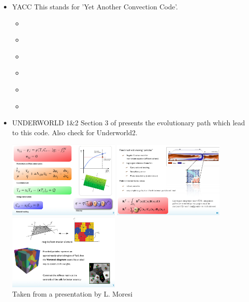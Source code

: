 \begin{itemize}
\item {\codefont YACC} 
This stands for 'Yet Another Convection Code'.

\begin{scriptsize}
\begin{itemize}
\item[\twothousandten]       \textcite{toyc10}
\item[\twothousandeleven]    \textcite{yutc11}
\item[\twothousandtwelve]    \textcite{sato12}
\item[\twothousandthirteen]  \textcite{toyd13}
\item[\twothousandfifteen]   \textcite{tosn15}
\item[\twothousandsixteen]   \textcite{tomy16}
\end{itemize}
\end{scriptsize}

\item {\codefont UNDERWORLD 1\&2} 
Section 3 of \cite{qums07} presents the evolutionary path which lead to this code.
Also check \cite{magm20} for Underworld2. 

\begin{center}
\includegraphics[width=5.5cm]{images/codes/underworld1}
\includegraphics[width=5.5cm]{images/codes/underworld2}
\includegraphics[width=5.5cm]{images/codes/underworld3}\\
{\captionfont Taken from a presentation by L. Moresi}
\end{center}



\end{itemize}
